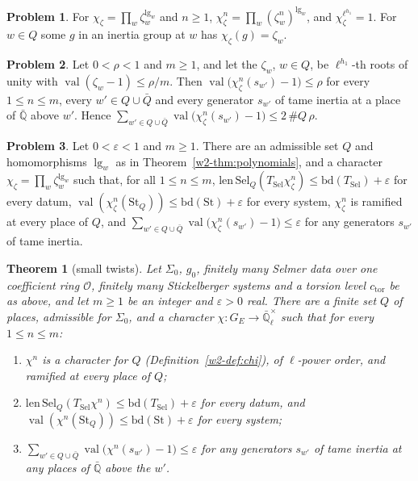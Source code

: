 \documentclass[reqno]{amsart}
\theoremstyle{definition}
\newtheorem{problem}{Problem}[section]
\theoremstyle{plain}
\newtheorem{theorem}{Theorem}[section]
\newcommand{\Q}{\mathbb{Q}}
\newcommand{\Ql}{\bar{\mathbb{Q}}_\ell}
\newcommand{\Sel}{\mathrm{Sel}}
\newcommand{\val}{\operatorname{val}}
\newcommand{\Oc}{\mathcal{O}}
\newcommand{\St}{\mathrm{St}}
\newcommand{\bd}{\mathrm{bd}}
\newcommand{\TS}{T_{\mathrm{Sel}}}
\newcommand{\ctor}{c_{\mathrm{tor}}}
\begin{document}
\begin{problem}\label{pr:psi-power}
For \(\chi_\zeta = \prod_{w} \zeta_w^{\lg_w}\) and \(n \ge 1\), \(\chi_\zeta^n = \prod_{w} (\zeta_w^n)^{\lg_w}\), and \(\chi_\zeta^{\ell^{h_1}} = 1\).  For \(w \in Q\) some \(g\) in an inertia group at \(w\) has \(\chi_\zeta(g) = \zeta_w\).
\end{problem}

\begin{problem}\label{pr:inertia-sum}
Let \(0 < \rho < 1\) and \(m \ge 1\), and let the \(\zeta_w\), \(w \in Q\), be \(\ell^{h_1}\)-th roots of unity with \(\val(\zeta_w - 1) \le \rho/m\).  Then \(\val\bigl(\chi_\zeta^n(s_{w'}) - 1\bigr) \le \rho\) for every \(1 \le n \le m\), every \(w' \in Q \cup \bar Q\) and every generator \(s_{w'}\) of tame inertia at a place of \(\bar{\Q}\) above \(w'\).  Hence \(\sum_{w' \in Q \cup \bar Q}\val\bigl(\chi_\zeta^n(s_{w'}) - 1\bigr) \le 2\,\#Q\,\rho\).
\end{problem}

\begin{problem}\label{pr:twist-from-roots}
Let \(0 < \varepsilon < 1\) and \(m \ge 1\).  There are an admissible set \(Q\) and homomorphisms \(\lg_w\) as in Theorem~\ref{w2-thm:polynomials}, and a character \(\chi_\zeta = \prod_{w} \zeta_w^{\lg_w}\) such that, for all \(1 \le n \le m\), \(\mathrm{len}\,\Sel_Q(\TS\chi_\zeta^n) \le \bd(\TS) + \varepsilon\) for every datum, \(\val(\chi_\zeta^n(\St_Q)) \le \bd(\St) + \varepsilon\) for every system, \(\chi_\zeta^n\) is ramified at every place of \(Q\), and \(\sum_{w' \in Q \cup \bar Q}\val\bigl(\chi_\zeta^n(s_{w'}) - 1\bigr) \le \varepsilon\) for any generators \(s_{w'}\) of tame inertia.
\end{problem}

\begin{theorem}[small twists]\label{thm:small}
Let \(\Sigma_0\), \(g_0\), finitely many Selmer data over one coefficient ring \(\Oc\), finitely many Stickelberger systems and a torsion level \(\ctor\) be as above, and let \(m \ge 1\) be an integer and \(\varepsilon > 0\) real.  There are a finite set \(Q\) of places, admissible for \(\Sigma_0\), and a character \(\chi\colon G_E \to \Ql^\times\) such that for every \(1 \le n \le m\):
\begin{enumerate}
\item \(\chi^n\) is a character for \(Q\) (Definition~\ref{w2-def:chi}), of \(\ell\)-power order, and ramified at every place of \(Q\);
\item \(\mathrm{len}\,\Sel_Q(\TS\chi^n) \le \bd(\TS) + \varepsilon\) for every datum, and \(\val(\chi^n(\St_Q)) \le \bd(\St) + \varepsilon\) for every system;
\item \(\sum_{w' \in Q \cup \bar Q}\val\bigl(\chi^n(s_{w'}) - 1\bigr) \le \varepsilon\) for any generators \(s_{w'}\) of tame inertia at any places of \(\bar{\Q}\) above the \(w'\).
\end{enumerate}
\end{theorem}
\end{document}
